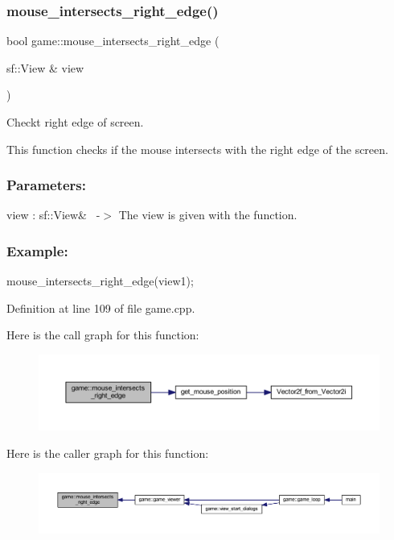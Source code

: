 \subsubsection{\texorpdfstring{mouse\+\_\+intersects\+\_\+right\+\_\+edge()}{mouse\_intersects\_right\_edge()}}
{\footnotesize\ttfamily bool game\+::mouse\+\_\+intersects\+\_\+right\+\_\+edge (\begin{DoxyParamCaption}\item[{sf\+::\+View \&}]{view }\end{DoxyParamCaption})\hspace{0.3cm}{\ttfamily [private]}}



Checkt right edge of screen. 

This function checks if the mouse intersects with the right edge of the screen.~\newline
 \subsubsection*{Parameters\+: }

view \+: sf\+::\+View\&~\newline
-\/$>$ The view is given with the function.

\subsubsection*{Example\+: }

mouse\+\_\+intersects\+\_\+right\+\_\+edge(view1); 

Definition at line 109 of file game.\+cpp.

Here is the call graph for this function\+:
\nopagebreak
\begin{figure}[H]
\begin{center}
\leavevmode
\includegraphics[width=350pt]{classgame_a273013552bc7ad8fef9d9192aad3cc0c_cgraph}
\end{center}
\end{figure}
Here is the caller graph for this function\+:
\nopagebreak
\begin{figure}[H]
\begin{center}
\leavevmode
\includegraphics[width=350pt]{classgame_a273013552bc7ad8fef9d9192aad3cc0c_icgraph}
\end{center}
\end{figure}
\mbox{\label{classgame_abb1c33c5a73de27e4ebd20e1b61dc3dc}} 
